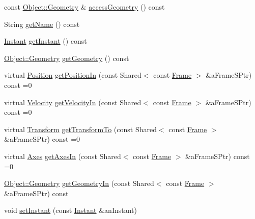 \begin{DoxyCompactItemize}
const \hyperlink{classostk_1_1physics_1_1env_1_1_object_a66e44a65aefb23a184a6de531e96935d}{Object\+::\+Geometry} \& \hyperlink{classostk_1_1physics_1_1env_1_1_object_af5556cdc8db2a35e8549b79d481ceada}{access\+Geometry} () const
\item 
String \hyperlink{classostk_1_1physics_1_1env_1_1_object_a4157537667421ed215929113222ef909}{get\+Name} () const
\item 
\hyperlink{classostk_1_1physics_1_1time_1_1_instant}{Instant} \hyperlink{classostk_1_1physics_1_1env_1_1_object_ac0b6d3717624300bb9f5576996c00077}{get\+Instant} () const
\item 
\hyperlink{classostk_1_1physics_1_1env_1_1_object_a66e44a65aefb23a184a6de531e96935d}{Object\+::\+Geometry} \hyperlink{classostk_1_1physics_1_1env_1_1_object_aa74070ed996907de5a2821233d1aa555}{get\+Geometry} () const
\item 
virtual \hyperlink{classostk_1_1physics_1_1coord_1_1_position}{Position} \hyperlink{classostk_1_1physics_1_1env_1_1_object_a990c33e0cc9e9421488f9fc4cbbf3f21}{get\+Position\+In} (const Shared$<$ const \hyperlink{classostk_1_1physics_1_1coord_1_1_frame}{Frame} $>$ \&a\+Frame\+S\+Ptr) const =0
\item 
virtual \hyperlink{classostk_1_1physics_1_1coord_1_1_velocity}{Velocity} \hyperlink{classostk_1_1physics_1_1env_1_1_object_a216c8d5e44451fd664e0c7eb3b4934b6}{get\+Velocity\+In} (const Shared$<$ const \hyperlink{classostk_1_1physics_1_1coord_1_1_frame}{Frame} $>$ \&a\+Frame\+S\+Ptr) const =0
\item 
virtual \hyperlink{classostk_1_1physics_1_1coord_1_1_transform}{Transform} \hyperlink{classostk_1_1physics_1_1env_1_1_object_a720f81e696c3f4f81de8e7ae787fdf10}{get\+Transform\+To} (const Shared$<$ const \hyperlink{classostk_1_1physics_1_1coord_1_1_frame}{Frame} $>$ \&a\+Frame\+S\+Ptr) const =0
\item 
virtual \hyperlink{classostk_1_1physics_1_1coord_1_1_axes}{Axes} \hyperlink{classostk_1_1physics_1_1env_1_1_object_a706d29c77ce311a3abcf2a6060515711}{get\+Axes\+In} (const Shared$<$ const \hyperlink{classostk_1_1physics_1_1coord_1_1_frame}{Frame} $>$ \&a\+Frame\+S\+Ptr) const =0
\item 
\hyperlink{classostk_1_1physics_1_1env_1_1_object_a66e44a65aefb23a184a6de531e96935d}{Object\+::\+Geometry} \hyperlink{classostk_1_1physics_1_1env_1_1_object_adb5784e72236cf93239d8a726fae45ac}{get\+Geometry\+In} (const Shared$<$ const \hyperlink{classostk_1_1physics_1_1coord_1_1_frame}{Frame} $>$ \&a\+Frame\+S\+Ptr) const
\item 
void \hyperlink{classostk_1_1physics_1_1env_1_1_object_a1cfbdcd0259692801469fbefee7790a6}{set\+Instant} (const \hyperlink{classostk_1_1physics_1_1time_1_1_instant}{Instant} \&an\+Instant)
\end{DoxyCompactItemize}
